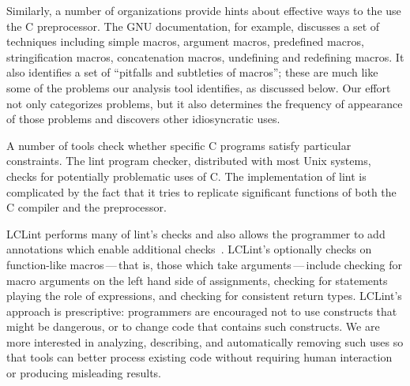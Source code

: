 \documentclass[11pt]{article}
\begin{document}
Similarly, a number of organizations provide hints about effective
ways to the use the C preprocessor.  The GNU documentation, for example,
discusses a set of techniques including simple macros, argument
macros, predefined macros, stringification macros, concatenation
macros, undefining and redefining
macros.
It also identifies a set of ``pitfalls and subtleties of
macros''; these are much like some of the problems our analysis tool
identifies, as discussed below.  Our effort not only categorizes
problems, but it also determines the frequency of appearance of those
problems and discovers other idiosyncratic uses.

A number of tools check whether specific C programs
satisfy particular constraints.  The lint program checker, distributed
with most Unix systems, checks for potentially problematic uses of C\@.
The implementation of lint is complicated by the fact
that it tries to replicate significant functions of both the C
compiler and the preprocessor.

LCLint performs many of lint's checks and also
allows the programmer to add annotations which enable additional
checks~\cite{Evans-pldi96,Evans-fse94}.
LCLint's  optionally checks  on function-like
macros\,---\,that is, those which take arguments\,---\,include checking for
macro arguments on the left hand side of assignments, checking for statements
playing the role of expressions, and checking for consistent return types.
LCLint's approach is prescriptive: programmers are encouraged not to use
constructs that might be dangerous, or to change code that contains such
constructs.  We are more interested in analyzing, describing, and
automatically removing such uses so that tools can better process existing
code without requiring human interaction or producing misleading results.
\end{document}
